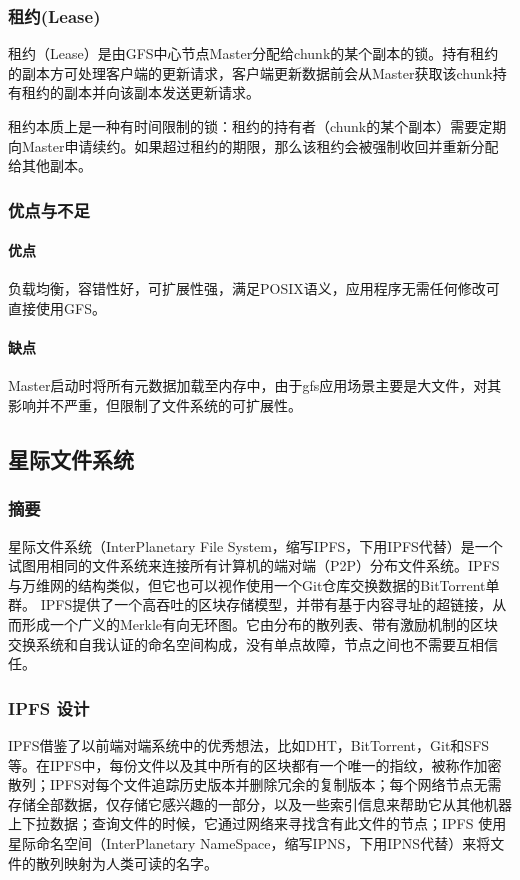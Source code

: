 \documentclass{ctexart}
\begin{document}
\subsubsection{租约(Lease)}
租约（Lease）是由GFS中心节点Master分配给chunk的某个副本的锁。持有租约的副本方可处理客户端的更新请求，客户端更新数据前会从Master获取该chunk持有租约的副本并向该副本发送更新请求。

租约本质上是一种有时间限制的锁：租约的持有者（chunk的某个副本）需要定期向Master申请续约。如果超过租约的期限，那么该租约会被强制收回并重新分配给其他副本。
\subsubsection{优点与不足}
\paragraph{优点}
负载均衡，容错性好，可扩展性强，满足POSIX语义，应用程序无需任何修改可直接使用GFS。
\paragraph{缺点}
Master启动时将所有元数据加载至内存中，由于gfs应用场景主要是大文件，对其影响并不严重，但限制了文件系统的可扩展性。

\subsection{星际文件系统}
\subsubsection{摘要}
星际文件系统（InterPlanetary File System，缩写IPFS，下用IPFS代替）是一个试图用相同的文件系统来连接所有计算机的端对端（P2P）分布文件系统。IPFS 与万维网的结构类似，但它也可以视作使用一个Git仓库交换数据的BitTorrent单群。 IPFS提供了一个高吞吐的区块存储模型，并带有基于内容寻址的超链接，从而形成一个广义的Merkle有向无环图。它由分布的散列表、带有激励机制的区块交换系统和自我认证的命名空间构成，没有单点故障，节点之间也不需要互相信任。
\subsubsection{IPFS 设计}
IPFS借鉴了以前端对端系统中的优秀想法，比如DHT，BitTorrent，Git和SFS等。在IPFS中，每份文件以及其中所有的区块都有一个唯一的指纹，被称作加密散列；IPFS对每个文件追踪历史版本并删除冗余的复制版本；每个网络节点无需存储全部数据，仅存储它感兴趣的一部分，以及一些索引信息来帮助它从其他机器上下拉数据；查询文件的时候，它通过网络来寻找含有此文件的节点；IPFS 使用星际命名空间（InterPlanetary NameSpace，缩写IPNS，下用IPNS代替）来将文件的散列映射为人类可读的名字。
\end{document}
